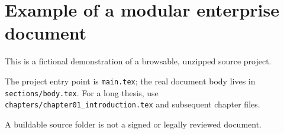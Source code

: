 \section*{Example of a modular enterprise document}
This is a fictional demonstration of a browsable, unzipped source project.

The project entry point is \texttt{main.tex}; the real document body lives in
\texttt{sections/body.tex}. For a long thesis, use
\texttt{chapters/chapter01\_introduction.tex} and subsequent chapter files.

A buildable source folder is not a signed or legally reviewed document.
